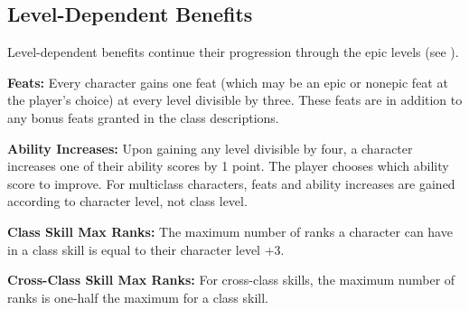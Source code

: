 \subsection{Level-Dependent Benefits}
Level-dependent benefits continue their progression through the epic levels (see ).


\textbf{Feats:} Every character gains one feat (which may be an epic or nonepic feat at the player's choice) at every level divisible by three. These feats are in addition to any bonus feats granted in the class descriptions.

\textbf{Ability Increases:} Upon gaining any level divisible by four, a character increases one of their ability scores by 1 point. The player chooses which ability score to improve. For multiclass characters, feats and ability increases are gained according to character level, not class level.

\textbf{Class Skill Max Ranks:} The maximum number of ranks a character can have in a class skill is equal to their character level +3.

\textbf{Cross-Class Skill Max Ranks:} For cross-class skills, the maximum number of ranks is one-half the maximum for a class skill.